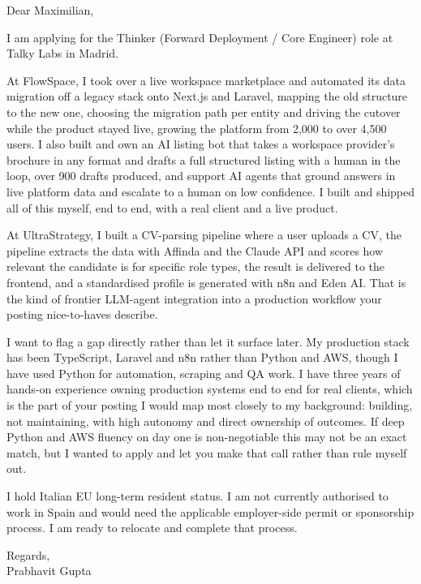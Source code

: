 \documentclass[a4paper,11pt]{article}
\begin{document}
Dear Maximilian,

I am applying for the Thinker (Forward Deployment / Core Engineer) role at Talky Labs in Madrid.

At FlowSpace, I took over a live workspace marketplace and automated its data migration off a legacy stack onto Next.js and Laravel, mapping the old structure to the new one, choosing the migration path per entity and driving the cutover while the product stayed live, growing the platform from 2,000 to over 4,500 users. I also built and own an AI listing bot that takes a workspace provider's brochure in any format and drafts a full structured listing with a human in the loop, over 900 drafts produced, and support AI agents that ground answers in live platform data and escalate to a human on low confidence. I built and shipped all of this myself, end to end, with a real client and a live product.

At UltraStrategy, I built a CV-parsing pipeline where a user uploads a CV, the pipeline extracts the data with Affinda and the Claude API and scores how relevant the candidate is for specific role types, the result is delivered to the frontend, and a standardised profile is generated with n8n and Eden AI. That is the kind of frontier LLM-agent integration into a production workflow your posting nice-to-haves describe.

I want to flag a gap directly rather than let it surface later. My production stack has been TypeScript, Laravel and n8n rather than Python and AWS, though I have used Python for automation, scraping and QA work. I have three years of hands-on experience owning production systems end to end for real clients, which is the part of your posting I would map most closely to my background: building, not maintaining, with high autonomy and direct ownership of outcomes. If deep Python and AWS fluency on day one is non-negotiable this may not be an exact match, but I wanted to apply and let you make that call rather than rule myself out.

I hold Italian EU long-term resident status. I am not currently authorised to work in Spain and would need the applicable employer-side permit or sponsorship process. I am ready to relocate and complete that process.

Regards,\\
Prabhavit Gupta
\end{document}
